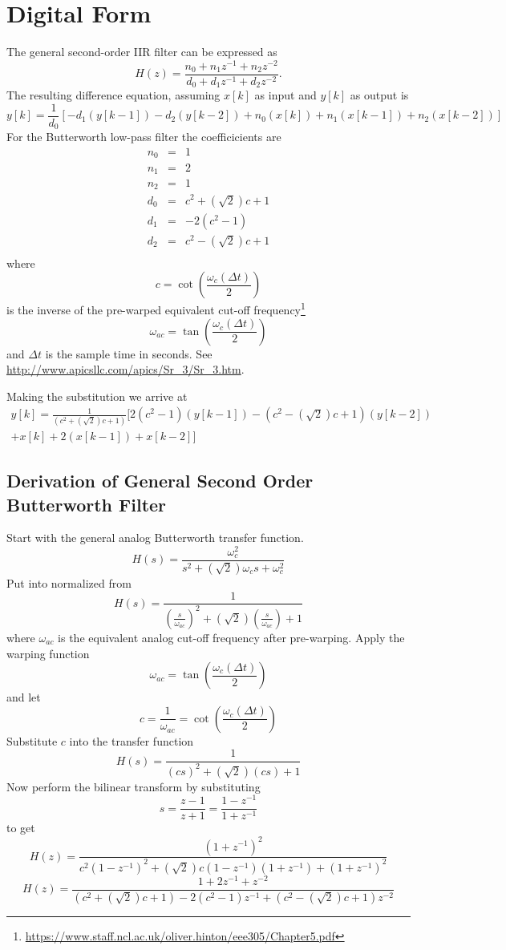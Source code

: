 \documentclass[12pt, letterpaper]{article}
\begin{document}
\section{Digital Form}
The general second-order IIR filter can be expressed as
\[ 
H(z) = \frac{n_0+n_1 z^{-1} + n_2 z^{-2}}{d_0 +d_1 z^{-1}+d_2 z^{-2}}.
\]
The resulting difference equation, assuming $x[k]$ as input and $y[k]$ as output is
\[
y[k] = \frac{1}{d_0}\left[ -d_1 (y[k-1]) -d_2(y[k-2]) + n_0(x[k]) + n_1(x[k-1]) + n_2 (x[k-2])\right]
\]
For the Butterworth low-pass filter the coefficicients are
\begin{eqnarray*}
n_0 & = & 1 \\
n_1 & = & 2 \\
n_2 & = & 1 \\
d_0 & = & c^2+(\sqrt{2})c+1 \\ 
d_1 & = & -2(c^2-1) \\ 
d_2 & = & c^2-(\sqrt{2})c+1 \\ 
\end{eqnarray*}
where
\[
c = \cot{\left(\frac{\omega_c (\Delta t)}{2}\right)}
\]
is the inverse of the pre-warped equivalent cut-off frequency\footnote{\url{https://www.staff.ncl.ac.uk/oliver.hinton/eee305/Chapter5.pdf}}
\[
\omega_{ac} = \tan{\left(\frac{\omega_c (\Delta t)}{2}\right)}
\]
and $\Delta t$ is the sample time in seconds.  See \url{http://www.apicsllc.com/apics/Sr_3/Sr_3.htm}.

Making the substitution we arrive at
\begin{multline*}
y[k] = \frac{1}{(c^2+(\sqrt{2})c+1)} \biggl[ 2(c^2-1)(y[k-1]) -(c^2-(\sqrt{2})c+1)(y[k-2])  \\
+ x[k] + 2(x[k-1]) + x[k-2]\biggr]
\end{multline*}

\subsection{Derivation of General Second Order Butterworth Filter}
Start with the general analog Butterworth transfer function.
\[
H(s) = \frac{\omega_c^2}{s^2 + (\sqrt{2})\omega_c s + \omega_c^2}
\]
Put into normalized from
\[
H(s) = \frac{1}{\left(\frac{s}{\omega_{ac}}\right)^2 + (\sqrt{2})\left(\frac{s}{\omega_{ac}}\right) + 1}
\]
where $\omega_{ac}$ is the equivalent analog cut-off frequency after pre-warping.
Apply the warping function
\[
\omega_{ac} = \tan{\left(\frac{\omega_c (\Delta t)}{2}\right)}
\]
and let
\[
c = \frac{1}{\omega_{ac}}=\cot{\left(\frac{\omega_c (\Delta t)}{2}\right)}
\]
Substitute $c$ into the transfer function
\[
H(s) = \frac{1}{(cs)^2 + (\sqrt{2})(cs) + 1}
\]
Now perform the bilinear transform by substituting
\[
s = \frac{z-1}{z+1}=\frac{1-z^{-1}}{1+z^{-1}}
\]
to get
\[
H(z) = \frac{ (1+z^{-1})^2 }{ c^2 (1-z^{-1})^2 + (\sqrt{2}) c (1-z^{-1})(1+z^{-1})+(1+z^{-1})^2}
\]
\[
H(z) = \frac{ 1 + 2 z^{-1} + z^{-2} }{ (c^2+(\sqrt{2})c+1) - 2(c^2-1)z^{-1} + (c^2 - (\sqrt{2})c +1) z^{-2}}
\]
\end{document}
